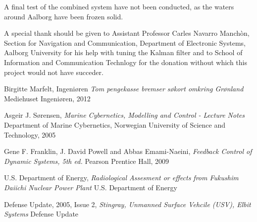 \documentclass[journal]{IEEEtran}
\begin{document}
A final test of the combined system have not been conducted, as the waters around Aalborg have been frozen solid. 

\begin{ack}                               %
A special thank should be given to Assistant Professor Carles Navarro Manchòn, Section for Navigation and Communication, Department of Electronic Systems, Aalborg University for his help with tuning the Kalman filter and to School of Information and Communication Technlogy for the donation without which this project would not have succeder.  %
\end{ack}

%

\begin{thebibliography}{xx}

Birgitte Marfelt,
\newblock Ingeni\o ren
\newblock \emph{Tom pengekasse bremser søkort omkring Gr\o nland}
\newblock Mediehuset Ingeniøren, 2012

Asgeir J. S\o rensen,
\newblock \emph{Marine Cybernetics, Modelling and Control - Lecture Notes}
\newblock Department of Marine Cybernetics, Norwegian University of Science and Technology, 2005

Gene F. Franklin, J. David Powell and Abbas Emami-Naeini,
\newblock \emph{Feedback Control of Dynamic Systems, 5th ed.}
\newblock Pearson Prentice Hall, 2009

U.S. Department of Energy,
\newblock \emph{Radiological Assesment or effects from Fukushim Daiichi Nuclear Power Plant}
\newblock U.S. Department of Energy

Defense Update, 2005, Issue 2,
\newblock \emph{Stingray, Unmanned Surface Vehcile (USV), Elbit Systems}
\newblock Defense Update

\end{thebibliography}
\end{document}
